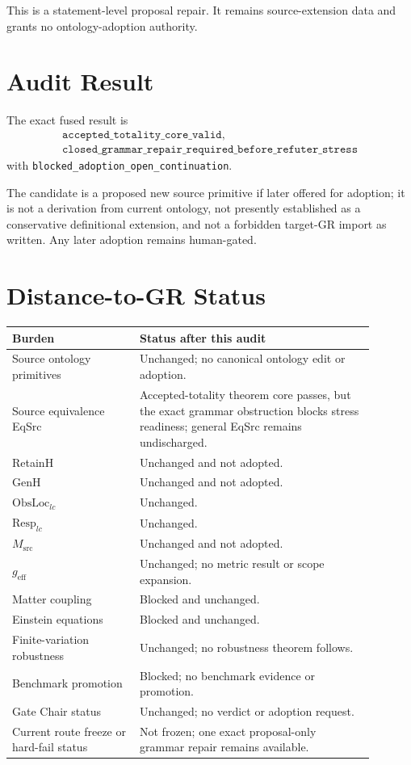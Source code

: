 \documentclass[11pt]{article}
\begin{document}
This is a statement-level proposal repair. It remains source-extension data
and grants no ontology-adoption authority.

\section{Audit Result}

The exact fused result is
\[
\boxed{
\begin{gathered}
\texttt{accepted\_totality\_core\_valid,}\\
\texttt{closed\_grammar\_repair\_required\_before\_refuter\_stress}
\end{gathered}}
\]
with \texttt{blocked\_adoption\_open\_continuation}.

The candidate is a proposed new source primitive if later offered for
adoption; it is not a derivation from current ontology, not presently
established as a conservative definitional extension, and not a forbidden
target-GR import as written. Any later adoption remains human-gated.

\section{Distance-to-GR Status}

\begin{longtable}{p{0.31\linewidth}p{0.58\linewidth}}
\toprule
Burden & Status after this audit \\
\midrule
Source ontology primitives & Unchanged; no canonical ontology edit or adoption. \\
Source equivalence EqSrc & Accepted-totality theorem core passes, but the exact grammar obstruction blocks stress readiness; general EqSrc remains undischarged. \\
RetainH & Unchanged and not adopted. \\
GenH & Unchanged and not adopted. \\
\(\mathrm{ObsLoc}_{lc}\) & Unchanged. \\
\(\mathrm{Resp}_{lc}\) & Unchanged. \\
\(M_{\mathrm{src}}\) & Unchanged and not adopted. \\
\(g_{\mathrm{eff}}\) & Unchanged; no metric result or scope expansion. \\
Matter coupling & Blocked and unchanged. \\
Einstein equations & Blocked and unchanged. \\
Finite-variation robustness & Unchanged; no robustness theorem follows. \\
Benchmark promotion & Blocked; no benchmark evidence or promotion. \\
Gate Chair status & Unchanged; no verdict or adoption request. \\
Current route freeze or hard-fail status & Not frozen; one exact proposal-only grammar repair remains available. \\
\bottomrule
\end{longtable}
\end{document}
